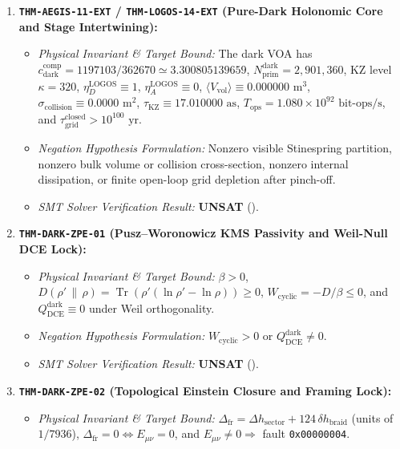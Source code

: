 \documentclass[11pt,onecolumn]{article}
\DeclareMathOperator{\Tr}{Tr}
\begin{document}
\begin{enumerate}
    \item \textbf{\texttt{THM-AEGIS-11-EXT} / \texttt{THM-LOGOS-14-EXT} (Pure-Dark Holonomic Core and Stage Intertwining):}
    \begin{itemize}
        \item \emph{Physical Invariant \& Target Bound:} The dark VOA has $c_{\text{dark}}^{\text{comp}}=1197103/362670\simeq3.300805139659$, $N_{\text{prim}}^{\text{dark}}=2{,}901{,}360$, KZ level $\kappa=320$, $\eta_D^{\text{LOGOS}}\equiv1$, $\eta_A^{\text{LOGOS}}\equiv0$, $\langle V_{\text{vol}}\rangle\equiv0.000000\text{ m}^3$, $\sigma_{\text{collision}}\equiv0.0000\text{ m}^2$, $\tau_{\text{KZ}}\equiv17.010000\text{ as}$, $T_{\text{ops}}=1.080\times10^{92}\text{ bit-ops/s}$, and $\tau_{\text{grid}}^{\text{closed}}>10^{100}\text{ yr}$.
        \item \emph{Negation Hypothesis Formulation:} Nonzero visible Stinespring partition, nonzero bulk volume or collision cross-section, nonzero internal dissipation, or finite open-loop grid depletion after pinch-off.
        \item \emph{SMT Solver Verification Result:} \textbf{UNSAT} ().
    \end{itemize}
    \item \textbf{\texttt{THM-DARK-ZPE-01} (Pusz--Woronowicz KMS Passivity and Weil-Null DCE Lock):}
    \begin{itemize}
        \item \emph{Physical Invariant \& Target Bound:} $\beta>0$, $D(\rho'\,\|\,\rho)=\Tr(\rho'(\ln\rho'-\ln\rho))\ge0$, $W_{\text{cyclic}}=-D/\beta\le0$, and $Q_{\text{DCE}}^{\text{dark}}\equiv0$ under Weil orthogonality.
        \item \emph{Negation Hypothesis Formulation:} $W_{\text{cyclic}}>0$ or $Q_{\text{DCE}}^{\text{dark}}\neq0$.
        \item \emph{SMT Solver Verification Result:} \textbf{UNSAT} ().
    \end{itemize}
    \item \textbf{\texttt{THM-DARK-ZPE-02} (Topological Einstein Closure and Framing Lock):}
    \begin{itemize}
        \item \emph{Physical Invariant \& Target Bound:} $\Delta_{\text{fr}}=\Delta h_{\text{sector}}+124\,\delta h_{\text{braid}}$ (units of $1/7936$), $\Delta_{\text{fr}}=0\iff E_{\mu\nu}=0$, and $E_{\mu\nu}\neq0\Rightarrow$ fault \texttt{0x00000004}.

\end{itemize}
\end{enumerate}
\end{document}
